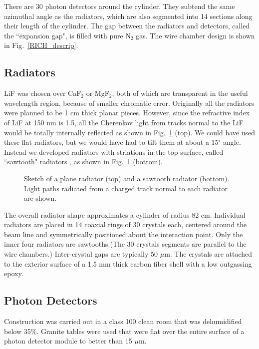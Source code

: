 \documentclass[fleqn,twoside]{article}
\begin{document}
There are 30 photon detectors around the cylinder. They subtend the same azimuthal angle as the radiators, which are also segmented into 14 sections along their length of the cylinder. The gap between the radiators and detectors, called the ``expansion gap", is filled with pure N$_2$ gas. The wire chamber design is shown in Fig.~\ref{RICH_descrip}.

\subsection{Radiators}

LiF was chosen over CaF$_2$ or MgF$_2$, both of which are
transparent in the useful wavelength region, because of smaller
chromatic error. Originally all the radiators were planned to be 1
cm thick planar pieces. However, since the refractive index of LiF
at 150 nm is 1.5, all the Cherenkov light from tracks normal to
the LiF would be totally internally reflected as shown in
Fig.~\ref{radiators} (top). We could have used these flat
radiators, but we would have had to tilt them at about a
15$^{\circ}$ angle. Instead we developed radiators with striations
in the top surface, called ``sawtooth" radiators \cite{efimov}, as
shown in Fig.~\ref{radiators} (bottom).

\begin{figure}[htb]
\vspace{-.3cm}
\centerline{}
\vspace{-.6cm} \caption{\label{radiators}Sketch of a plane
radiator (top) and a sawtooth radiator (bottom). Light paths
radiated from a charged track normal to each radiator are shown.}
\vspace{-0.7cm}\end{figure}

The overall radiator shape approximates a cylinder of radius 82
cm. Individual radiators are placed in 14 coaxial rings of 30
crystals each, centered around the beam line and symmetrically
positioned about the interaction point. Only the inner four radiators are sawtooths.(The 30 crystals segments
are parallel to the wire chambers.) Inter-crystal gaps are
typically 50 $\mu$m. The crystals are attached to the exterior
surface of a 1.5 mm thick carbon fiber shell with a low outgassing
epoxy.

\subsection{Photon Detectors}
Construction was carried out in a class 100 clean room that was dehumidified below 35\%. Granite tables were used that were flat over the entire surface of a photon detector module to better than 15 $\mu$m.
\end{document}
